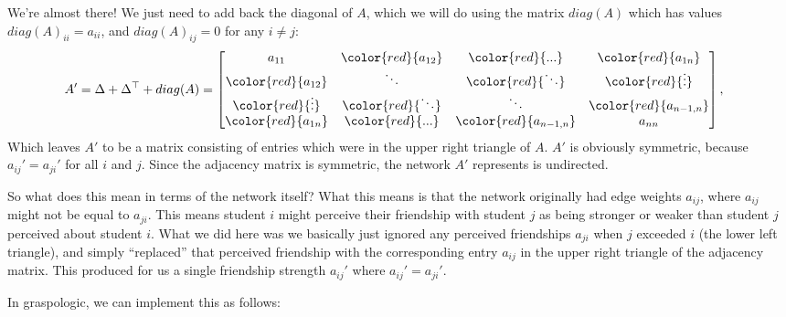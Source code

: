 \documentclass[letterpaper,10pt,english]{jupyterBook}
\begin{document}
\sphinxAtStartPar
We’re almost there! We just need to add back the diagonal of \(A\), which we will do using the matrix \(diag(A)\) which has values \(diag(A)_{ii} = a_{ii}\), and \(diag(A)_{ij} = 0\) for any \(i \neq j\):
\begin{align*}
    A' &= \Delta + \Delta^\top + diag(A) = \begin{bmatrix}
        a_{11} & \color{red}{a_{12}} & \color{red}{...} & \color{red}{a_{1n}} \\
        \color{red}{a_{12}} & \ddots & \color{red}{\ddots} & \color{red}{\vdots} \\
        \color{red}{\vdots}&\color{red}{\ddots} &\ddots & \color{red}{a_{n-1, n}}\\
        \color{red}{a_{1n}}&\color{red}{...} &\color{red}{a_{n-1,n}} & a_{nn}
    \end{bmatrix},
\end{align*}
\sphinxAtStartPar
Which leaves \(A'\) to be a matrix consisting  of entries which were in the upper right triangle of \(A\). \(A'\) is obviously symmetric, because \(a_{ij}' = a_{ji}'\) for all \(i\) and \(j\). Since the adjacency matrix is symmetric, the network \(A'\) represents is undirected.

\sphinxAtStartPar
So what does this mean in terms of the network itself? What this means is that the network originally had edge weights \(a_{ij}\), where \(a_{ij}\) might not be equal to \(a_{ji}\). This means student \(i\) might perceive their friendship with student \(j\) as being stronger or weaker than student \(j\) perceived about student \(i\). What we did here was we basically just ignored any perceived friendships \(a_{ji}\) when \(j\) exceeded \(i\) (the lower left triangle), and simply “replaced” that perceived friendship with the corresponding entry \(a_{ij}\) in the upper right triangle of the adjacency matrix. This produced for us a single friendship strength \(a_{ij}'\) where \(a_{ij}' = a_{ji}'\).

\sphinxAtStartPar
In graspologic, we can implement this as follows:

\begin{sphinxVerbatim}[commandchars=\\\{\}]
   

   
\end{sphinxVerbatim}
\end{document}
